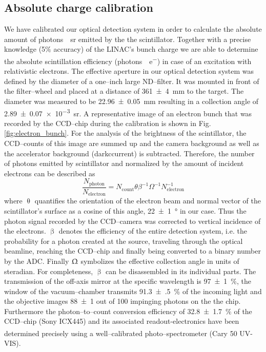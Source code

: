 \documentclass[%
reprint,
amsmath,
amssymb,
aip,
rsi, 
numerical,
floatfix,
]{revtex4-1}
\begin{document}
\subsection{\label{Ac} Absolute charge calibration}
We have calibrated our optical detection system in order to calculate the absolute amount of \si[per-mode=symbol]{photons \per \steradian}  emitted by the the scintillator.
Together with a precise knowledge (5$\%$ accuracy) of the LINAC's bunch charge we are able to determine the absolute scintillation efficiency (\si[per-mode=symbol]{photons \per e^-}) in case of an excitation with relativistic electrons.
The effective aperture in our optical detection system was defined by the diameter of a one--inch large ND--filter.
It was mounted in front of the filter--wheel and placed at a distance of \SI[separate-uncertainty = true]{361(4)}{\milli\metre} to the target.
The diameter was measured to be \SI[separate-uncertainty = true]{22.96(5)}{\milli\metre} resulting in a collection angle of \SI[separate-uncertainty = true]{2.89(7)e-3}{\steradian}.
A representative image of an electron bunch that was recorded by the CCD--chip during the calibration is shown in Fig. \ref{fig:electron_bunch}. For the analysis of the brightness of the scintillator, the CCD--counts of this image are summed up and the camera background as well as the accelerator background (darkccurrent) is subtracted. 
Therefore, the number of photons emitted by scintillator and normalized by the amount of incident electrons can be described as
\begin{equation}
\frac{N_{\text{photon}}}{N_{\text{electron}}} = N_{\text{count}}\theta\beta^{-1}\Omega^{-1}N_{\text{electron}}^{-1}
\end{equation}
where $\uptheta$ quantifies the orientation of the electron beam and normal vector of the scintillator's surface as a cosine of this angle, \SI[separate-uncertainty = true]{22(1)}{\degree} in our case.
Thus the photon signal recorded by the CCD--camera was corrected to vertical incidence of the electrons.
$\upbeta$ denotes the efficiency of the entire detection system, i.e. the probability for a photon created at the source, traveling through the optical beamline, reaching the CCD--chip and finally being converted to a binary number by the ADC.
Finally $\Upomega$ symbolizes the effective collection angle in units of steradian.
For completeness, $\upbeta$ can be disassembled in its individual parts. 
The transmission of the off-axis mirror at the specific wavelength is \SI[separate-uncertainty = true]{97(1)}{\%}, the window of the vacuum--chamber transmits \SI[separate-uncertainty = true]{91.3(5)}{\%} of the incoming light and the objective images \num[separate-uncertainty = true]{88(1)} out of 100 impinging photons on the the chip.
Furthermore the photon--to--count conversion efficiency of \SI[separate-uncertainty = true]{32.8(17)}{\%} of the CCD--chip (Sony ICX445) and its associated readout-electronics have been determined precisely using a well--calibrated photo--spectrometer (Cary\textsuperscript{\textregistered} 50 UV-VIS).  
\end{document}
